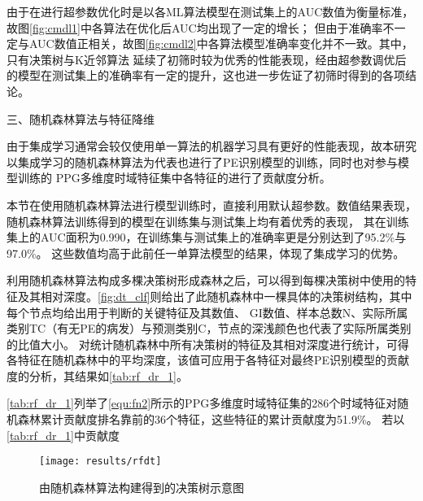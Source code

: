 由于在进行超参数优化时是以各ML算法模型在测试集上的AUC数值为衡量标准，故图\autoref{fig:cmdl1}中各算法在优化后AUC均出现了一定的增长；
但由于准确率不一定与AUC数值正相关，故图\autoref{fig:cmdl2}中各算法模型准确率变化并不一致。其中，只有决策树与K近邻算法
延续了初筛时较为优秀的性能表现，经由超参数调优后的模型在测试集上的准确率有一定的提升，这也进一步佐证了初筛时得到的各项结论。

三、随机森林算法与特征降维

由于集成学习通常会较仅使用单一算法的机器学习具有更好的性能表现，故本研究以集成学习的随机森林算法为代表也进行了PE识别模型的训练，同时也对参与模型训练的
PPG多维度时域特征集中各特征的进行了贡献度分析。

本节在使用随机森林算法进行模型训练时，直接利用默认超参数\cite{scikit-learn}。数值结果表现，随机森林算法训练得到的模型在训练集与测试集上均有着优秀的表现，
其在训练集上的AUC面积为0.990，在训练集与测试集上的准确率更是分别达到了95.2\%与97.0\%。
这些数值均高于此前任一单算法模型的结果，体现了集成学习的优势。

利用随机森林算法构成多棵决策树形成森林之后，可以得到每棵决策树中使用的特征及其相对深度。\autoref{fig:dt_clf}则给出了此随机森林中一棵具体的决策树结构，其中每个节点均给出用于判断的关键特征及其数值、
GI数值、样本总数N、实际所属类别TC（有无PE的病发）与预测类别C，节点的深浅颜色也代表了实际所属类别的比值大小。
对统计随机森林中所有决策树的特征及其相对深度进行统计，可得各特征在随机森林中的平均深度，该值可应用于各特征对最终PE识别模型的贡献度的分析，其结果如\autoref{tab:rf_dr_1}。

\autoref{tab:rf_dr_1}列举了\autoref{equ:fn2}所示的PPG多维度时域特征集的286个时域特征对随机森林累计贡献度排名靠前的36个特征，这些特征的累计贡献度为51.9\%。
若以\autoref{tab:rf_dr_1}中贡献度

\begin{figure}[htbp]
    \centering
    \texttt{[image: results/rfdt]}
    \caption{\label{fig:dt_clf}由随机森林算法构建得到的决策树示意图}
\end{figure}

